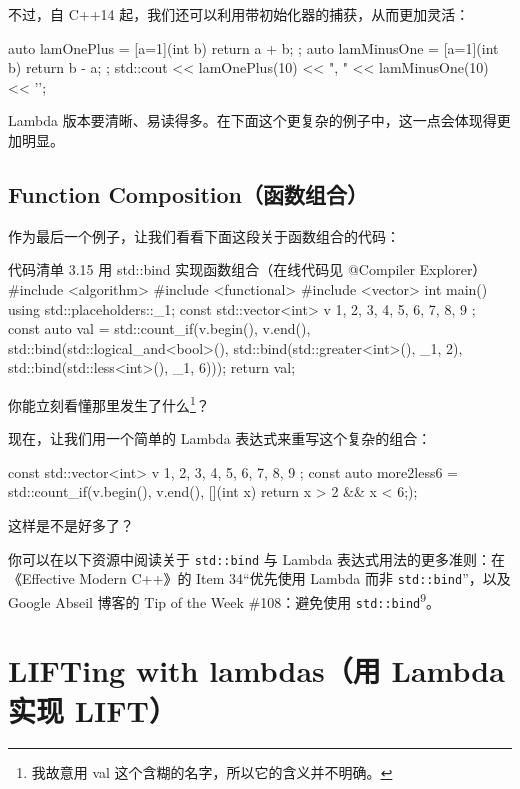 不过，自 C++14 起，我们还可以利用带初始化器的捕获，从而更加灵活：

\begin{codebox}
auto lamOnePlus = [a=1](int b) { return a + b; };
auto lamMinusOne = [a=1](int b) { return b - a; };
std::cout << lamOnePlus(10) << ", " << lamMinusOne(10) << '\n';
\end{codebox}

Lambda 版本要清晰、易读得多。在下面这个更复杂的例子中，这一点会体现得更加明显。

\subsection{Function Composition（函数组合）}

作为最后一个例子，让我们看看下面这段关于函数组合的代码：

\begin{codeboxt}{代码清单 3.15 用 std::bind 实现函数组合（在线代码见 @Compiler Explorer）}
#include <algorithm>
#include <functional>
#include <vector>
int main() {
using std::placeholders::_1;
const std::vector<int> v { 1, 2, 3, 4, 5, 6, 7, 8, 9 };
const auto val = std::count_if(v.begin(), v.end(),
std::bind(std::logical_and<bool>(),
std::bind(std::greater<int>(), _1, 2),
std::bind(std::less<int>(), _1, 6)));
return val;
}
\end{codeboxt}

你能立刻看懂那里发生了什么\footnote{我故意用 val 这个含糊的名字，所以它的含义并不明确。}？

现在，让我们用一个简单的 Lambda 表达式来重写这个复杂的组合：

\begin{codebox}
const std::vector<int> v { 1, 2, 3, 4, 5, 6, 7, 8, 9 };
const auto more2less6 = std::count_if(v.begin(), v.end(),
[](int x) { return x > 2 && x < 6;});
\end{codebox}

这样是不是好多了？


你可以在以下资源中阅读关于 \texttt{std::bind} 与 Lambda 表达式用法的更多准则：在《Effective Modern C++》的 Item 34“优先使用 Lambda 而非 \texttt{std::bind}”，以及 Google Abseil 博客的 Tip of the Week \#108：避免使用 \texttt{std::bind}\textsuperscript{9}。

\section{LIFTing with lambdas（用 Lambda 实现 LIFT）}


